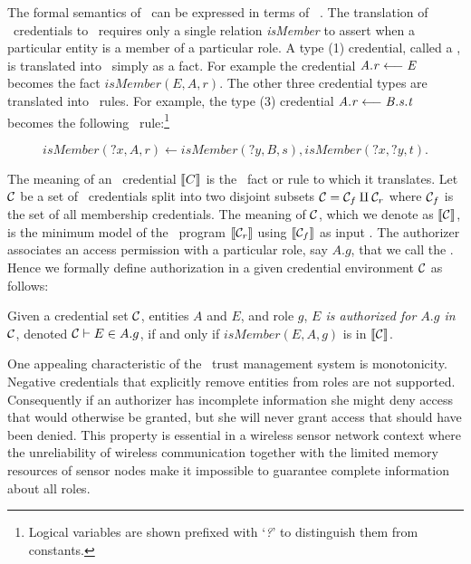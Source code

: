 The formal semantics of \RT\ can be expressed in terms of \datalog\
\cite{Li:DRBTMF}. The translation of \RT\ credentials to \datalog\
requires only a single relation \textit{isMember} to assert when a
particular entity is a member of a particular role. A type (1)
credential, called a \newterm{membership credential}, is translated into
\datalog\ simply as a fact. For example the credential $\mathit{A.r} \stackrel{}{\longleftarrow} \mathit{E}$
becomes the fact $\textit{isMember}(E, A, r)$. The other three
credential types are translated into \datalog\ rules. For example, the
type (3) credential $\mathit{A.r} \stackrel{}{\longleftarrow} \mathit{B.s.t}$ becomes the following \datalog\
rule:\footnote{Logical variables are shown prefixed with `\textit{?}' to
  distinguish them from constants.}

\begin{displaymath}
\textit{isMember}(\textit{?x}, A, r) \leftarrow
  \textit{isMember}(\textit{?y}, B, s),
  \textit{isMember}(\textit{?x}, \textit{?y}, t).
\end{displaymath}

The meaning of an \RT\ credential $\llbracket C \rrbracket$ is the \datalog\ fact
or rule to which it translates. Let $\mathcal{C}$ be a set of \RT\
credentials split into two disjoint subsets $\mathcal{C} = \mathcal{C}_f \amalg
\mathcal{C}_r$ where $\mathcal{C}_f$ is the set of all membership credentials. The
meaning of $\mathcal{C}$, which we denote as $\llbracket \mathcal{C} \rrbracket$, is the
minimum model of the \datalog\ program $\llbracket \mathcal{C}_r \rrbracket$ using
$\llbracket \mathcal{C}_f \rrbracket$ as input \cite{Abiteboul:FD}. The authorizer
associates an access permission with a particular role, say $A.g$, that
we call the \newterm{governing role}. Hence we formally define
authorization in a given credential environment $\mathcal{C}$ as follows:

\begin{definition}
  Given a credential set $\mathcal{C}$, entities $A$ and $E$, and role $g$,
  \emph{$E$ is authorized for $A.g$ in $\mathcal{C}$}, denoted $\mathcal{C} \vdash
  E \in A.g$, if and only if $\textit{isMember}(E, A, g)$ is in
  $\llbracket \mathcal{C} \rrbracket$.
\end{definition}

One appealing characteristic of the \RT\ trust management system is
monotonicity. Negative credentials that explicitly remove entities from
roles are not supported. Consequently if an authorizer has incomplete
information she might deny access that would otherwise be granted, but
she will never grant access that should have been denied. This property
is essential in a wireless sensor network context where the
unreliability of wireless communication together with the limited memory
resources of sensor nodes make it impossible to guarantee complete
information about all roles.

